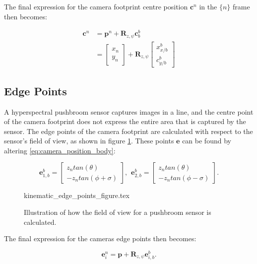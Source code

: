 The final expression for the camera footprint centre position $\mathbf{c}^n$ in the $\{n\}$ frame then becomes:

\begin{equation}
\label{eq:camera_position_ned}
\begin{split}
	\mathbf{c}^n & = \mathbf{p}^n + \mathbf{R}_{z,\psi} \mathbf{c}_b^b \\
	& =
	\begin{bmatrix}
		x_n \\ y_n
	\end{bmatrix}
	+ \mathbf{R}_{z,\psi}
	\begin{bmatrix}
		x_{x/b}^b \\ c_{y/b}^b
	\end{bmatrix}
\end{split}
\end{equation}


\subsection{Edge Points}

A hyperspectral pushbroom sensor captures images in a line, and the centre point of the camera footprint does not express the entire area that is captured by the sensor. The edge points of the camera footprint are calculated with respect to the sensor's field of view, as shown in figure \ref{fig:kinematics_edge_points}. These points $\mathbf{e}$ can be found by altering \ref{eq:camera_position_body}:

\begin{equation}
	\mathbf{e}_{1,b}^b =
	\begin{bmatrix}
		z_n tan(\theta) \\ -z_n tan(\phi + \sigma)
	\end{bmatrix}
	, \hspace{5pt}
	\mathbf{e}_{2,b}^b =
	\begin{bmatrix}
		z_n tan(\theta) \\ -z_n tan(\phi - \sigma)
	\end{bmatrix}.
\end{equation}

\begin{figure}
	{kinematic_edge_points_figure.tex}
	\caption{Illustration of how the field of view for a pushbroom sensor is calculated.}
	\label{fig:kinematics_edge_points}
\end{figure}

The final expression for the cameras edge points then becomes:

\begin{equation}
	\mathbf{e}_i^n = \mathbf{p} + \mathbf{R}_{z,\psi} \mathbf{e}_{i,b}^b.
\end{equation}